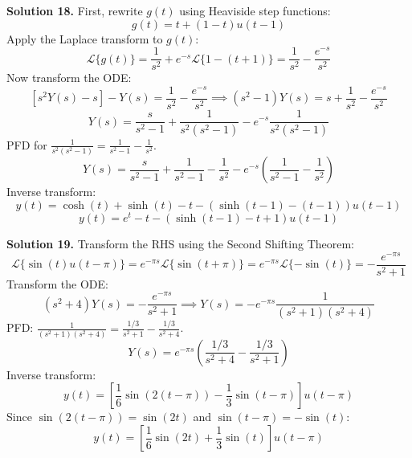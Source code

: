 \documentclass[11pt, letterpaper]{article}
\theoremstyle{definition}
\theoremstyle{remark}
\begin{document}
\vspace{1em}
\textbf{Solution 18.}
First, rewrite $g(t)$ using Heaviside step functions:
\[ g(t) = t + (1 - t)u(t - 1) \]
Apply the Laplace transform to $g(t)$:
\[ \mathcal{L}\{g(t)\} = \frac{1}{s^2} + e^{-s}\mathcal{L}\{1 - (t + 1)\} = \frac{1}{s^2} - \frac{e^{-s}}{s^2} \]
Now transform the ODE:
\[ [s^2 Y(s) - s] - Y(s) = \frac{1}{s^2} - \frac{e^{-s}}{s^2} \implies (s^2 - 1)Y(s) = s + \frac{1}{s^2} - \frac{e^{-s}}{s^2} \]
\[ Y(s) = \frac{s}{s^2 - 1} + \frac{1}{s^2(s^2 - 1)} - e^{-s}\frac{1}{s^2(s^2 - 1)} \]
PFD for $\frac{1}{s^2(s^2 - 1)} = \frac{1}{s^2 - 1} - \frac{1}{s^2}$.
\[ Y(s) = \frac{s}{s^2 - 1} + \frac{1}{s^2 - 1} - \frac{1}{s^2} - e^{-s}\left(\frac{1}{s^2 - 1} - \frac{1}{s^2}\right) \]
Inverse transform:
\[ y(t) = \cosh(t) + \sinh(t) - t - (\sinh(t - 1) - (t - 1))u(t - 1) \]
\[ y(t) = e^t - t - (\sinh(t - 1) - t + 1)u(t - 1) \]

\begin{center}
\end{center}

\vspace{1em}
\textbf{Solution 19.}
Transform the RHS using the Second Shifting Theorem:
\[ \mathcal{L}\{\sin(t)u(t - \pi)\} = e^{-\pi s}\mathcal{L}\{\sin(t + \pi)\} = e^{-\pi s}\mathcal{L}\{-\sin(t)\} = -\frac{e^{-\pi s}}{s^2 + 1} \]
Transform the ODE:
\[ (s^2 + 4)Y(s) = -\frac{e^{-\pi s}}{s^2 + 1} \implies Y(s) = -e^{-\pi s}\frac{1}{(s^2 + 1)(s^2 + 4)} \]
PFD: $\frac{1}{(s^2 + 1)(s^2 + 4)} = \frac{1/3}{s^2 + 1} - \frac{1/3}{s^2 + 4}$.
\[ Y(s) = e^{-\pi s}\left(\frac{1/3}{s^2 + 4} - \frac{1/3}{s^2 + 1}\right) \]
Inverse transform:
\[ y(t) = \left[ \frac{1}{6}\sin(2(t - \pi)) - \frac{1}{3}\sin(t - \pi) \right] u(t - \pi) \]
Since $\sin(2(t - \pi)) = \sin(2t)$ and $\sin(t - \pi) = -\sin(t)$:
\[ y(t) = \left[ \frac{1}{6}\sin(2t) + \frac{1}{3}\sin(t) \right] u(t - \pi) \]
\end{document}
